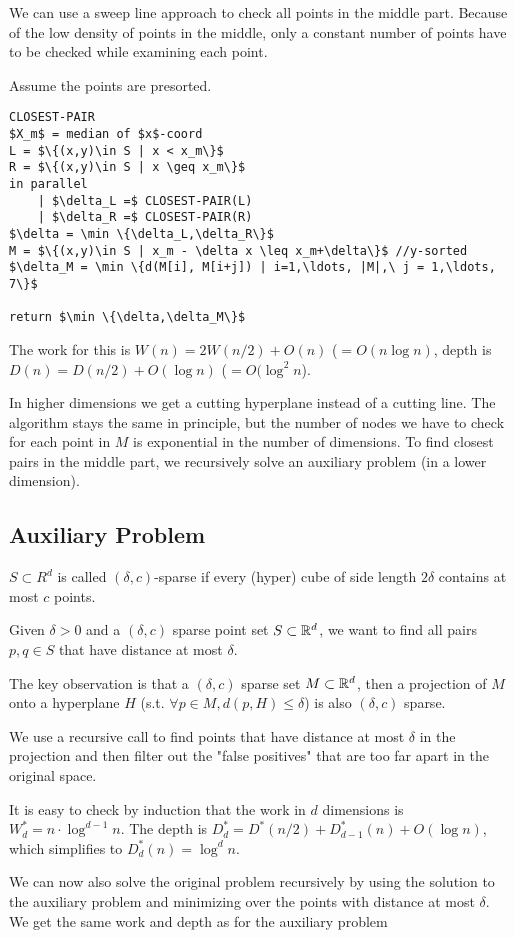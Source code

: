 We can use a sweep line approach to check all points in the middle part. Because of the low density of points in the middle, only a constant number of points have to be checked while examining each point.

Assume the points are presorted.

\begin{lstlisting}
CLOSEST-PAIR
$X_m$ = median of $x$-coord
L = $\{(x,y)\in S | x < x_m\}$
R = $\{(x,y)\in S | x \geq x_m\}$
in parallel
	| $\delta_L =$ CLOSEST-PAIR(L)
	| $\delta_R =$ CLOSEST-PAIR(R)
$\delta = \min \{\delta_L,\delta_R\}$
M = $\{(x,y)\in S | x_m - \delta x \leq x_m+\delta\}$ //y-sorted
$\delta_M = \min \{d(M[i], M[i+j]) | i=1,\ldots, |M|,\ j = 1,\ldots, 7\}$

return $\min \{\delta,\delta_M\}$
\end{lstlisting}

The work for this is $W(n) = 2W(n/2) + O(n)$ ($=O(n\log n)$, depth is $D(n) = D(n/2) + O(\log n)$ ($=O(\log ^2n$).

In higher dimensions we get a cutting hyperplane instead of a cutting line. The algorithm stays the same in principle, but the number of nodes we have to check for each point in $M$ is exponential in the number of dimensions. To find closest pairs in the middle part, we recursively solve an auxiliary problem (in a lower dimension).



\subsection{Auxiliary Problem}

\begin{Def} $S\subset R^d$ is called $(\delta, c)$-sparse if every (hyper) cube of side length $2\delta$ contains at most $c$ points.
\end{Def}

Given $\delta > 0$ and a $(\delta,c)$ sparse point set $S\subset \mathbb{R}^d$, we want to find all pairs $p,q\in S$ that have distance at most $\delta$.

The key observation is that a $(\delta,c)$ sparse set $M\subset \mathbb{R}^d$, then a projection of $M$ onto a hyperplane $H$ (s.t. $\forall p\in M, d(p,H)\leq \delta$) is also $(\delta,c)$ sparse.

We use a recursive call to find points that have distance at most $\delta$ in the projection and then filter out the "false positives" that are too far apart in the original space.

It is easy to check by induction that the work in $d$ dimensions is $W_d^* = n\cdot \log^{d-1} n$. The depth is $D_d^* = D^*(n/2) + D_{d-1}^*(n) + O(\log n)$, which simplifies to $D_d^*(n) = \log^d n$.

We can now also solve the original problem recursively by using the solution to the auxiliary problem and minimizing over the points with distance at most $\delta$. We get the same work and depth as for the auxiliary problem